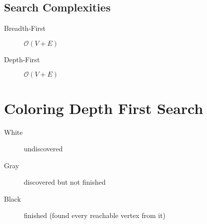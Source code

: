 \documentclass{article}
\begin{document}
\subsection{Search Complexities}
\begin{description}
    \item [Breadth-First] $\mathcal{O}(V+E)$
    \item [Depth-First] $\mathcal{O}(V+E)$
\end{description}

\section{Coloring Depth First Search}
\begin{description}
    \item [White] undiscovered
    \item [Gray] discovered but not finished
    \item [Black] finished (found every reachable vertex from it)
\end{description}
\end{document}
